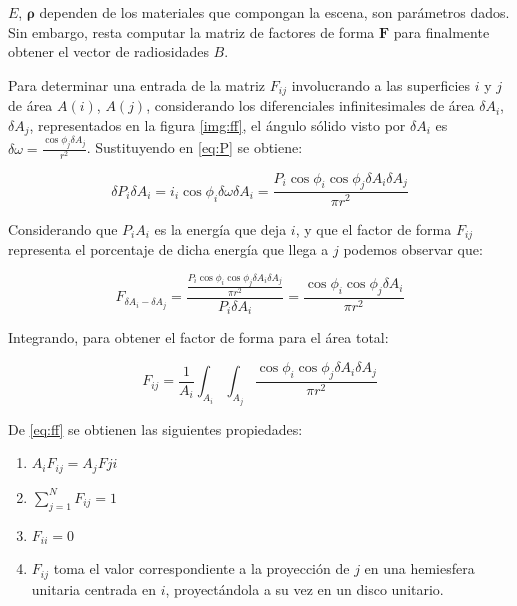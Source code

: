 $E$, $\mathbf{\rho}$ dependen de los materiales que compongan la escena, son parámetros dados. Sin embargo, resta computar la matriz de factores de forma $\mathbf{F}$ para finalmente obtener el vector de radiosidades $B$. 

Para determinar una entrada de la matriz $F_{ij}$ involucrando a las superficies $i$ y $j$ de área $A(i)$, $A(j)$, considerando los diferenciales infinitesimales de área $\delta{A_{i}}$, $\delta{A_{j}}$, representados en la figura \ref{img:ff}, el ángulo sólido visto por $\delta{A_{i}}$ es $\delta{\omega} = \frac{\cos{\phi_{j}\delta{A_{j}}}}{r^{2}}$. Sustituyendo en \eqref{eq:P} se obtiene:

\begin{equation}
    \delta{P}_{i}\delta{A_{i}} = i_{i} \cos{\phi_{i}}\delta{\omega}\delta{A_{i}} = \frac{P_{i}\cos{\phi_{i}}\cos{\phi_{j}}\delta{A_{i}}\delta{A_{j}}}{\pi r^{2}}
\end{equation}

Considerando que ${P}_{i}{A_{i}}$ es la energía que deja $i$, y que el factor de forma $F_{ij}$ representa el porcentaje de dicha energía que llega a $j$ podemos observar que:

\begin{equation}
    F_{\delta{A_{i}}-\delta{A_{j}}} = \frac{\frac{P_{i}\cos{\phi_{i}}\cos{\phi_{j}}\delta{A_{i}}\delta{A_{j}}}{\pi r^{2}}}{P_{i}\delta{A_{i}}} = \frac{\cos{\phi_{i}}\cos{\phi_{j}}\delta{A_{i}}}{\pi{r^{2}}}
\end{equation}

Integrando, para obtener el factor de forma para el área total:

\begin{equation}
    F_{ij} = \frac{1}{A_{i}} \int_{A_{i}}\int_{A_{j}}\frac{\cos{\phi_{i}}\cos{\phi_{j}}\delta{A_{i}}\delta{A_{j}}}{\pi{r^{2}}} \label{eq:ff}    
\end{equation}

De \eqref{eq:ff} se obtienen las siguientes propiedades:
\begin{enumerate}
	\label{propsff}
    \item $A_{i}F_{ij} = A_{j}F{ji}$
    \item $\sum_{j=1}^{N} F_{ij} = 1$
    \item $F_{ii} = 0$
    \item $F_{ij}$ toma el valor correspondiente a la proyección de $j$ en una hemiesfera unitaria centrada en $i$, proyectándola a su vez en un disco unitario.
\end{enumerate}


